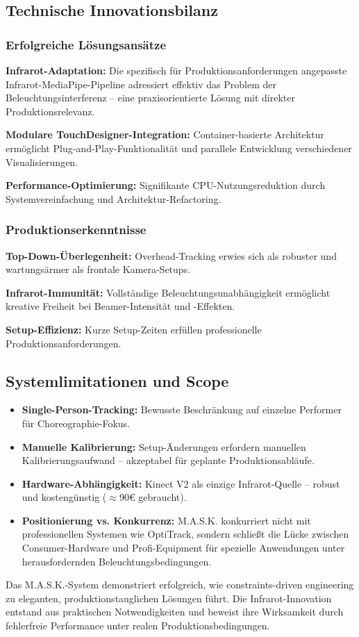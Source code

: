 \subsection{Technische Innovationsbilanz}

\subsubsection{Erfolgreiche Lösungsansätze}

\textbf{Infrarot-Adaptation:} Die spezifisch für Produktionsanforderungen angepasste Infrarot-MediaPipe-Pipeline adressiert effektiv das Problem der Beleuchtungsinterferenz – eine praxisorientierte Lösung mit direkter Produktionsrelevanz.

\textbf{Modulare TouchDesigner-Integration:} Container-basierte Architektur ermöglicht Plug-and-Play-Funktionalität und parallele Entwicklung verschiedener Visualisierungen.

\textbf{Performance-Optimierung:} Signifikante CPU-Nutzungsreduktion durch Systemvereinfachung und Architektur-Refactoring.

\subsubsection{Produktionserkenntnisse}

\textbf{Top-Down-Überlegenheit:} Overhead-Tracking erwies sich als robuster und wartungsärmer als frontale Kamera-Setups.

\textbf{Infrarot-Immunität:} Vollständige Beleuchtungsunabhängigkeit ermöglicht kreative Freiheit bei Beamer-Intensität und -Effekten.

\textbf{Setup-Effizienz:} Kurze Setup-Zeiten erfüllen professionelle Produktionsanforderungen.

\subsection{Systemlimitationen und Scope}

\begin{itemize}
    \item \textbf{Single-Person-Tracking:} Bewusste Beschränkung auf einzelne Performer für Choreographie-Fokus.
    \item \textbf{Manuelle Kalibrierung:} Setup-Änderungen erfordern manuellen Kalibrierungsaufwand – akzeptabel für geplante Produktionsabläufe.
    \item \textbf{Hardware-Abhängigkeit:} Kinect V2 als einzige Infrarot-Quelle – robust und kostengünstig ($\approx$90€ gebraucht).
    \item \textbf{Positionierung vs. Konkurrenz:} M.A.S.K. konkurriert nicht mit professionellen Systemen wie OptiTrack, sondern schließt die Lücke zwischen Consumer-Hardware und Profi-Equipment für spezielle Anwendungen unter herausfordernden Beleuchtungsbedingungen.
\end{itemize}

Das M.A.S.K.-System demonstriert erfolgreich, wie constraints-driven engineering zu eleganten, produktionstauglichen Lösungen führt. Die Infrarot-Innovation entstand aus praktischen Notwendigkeiten und beweist ihre Wirksamkeit durch fehlerfreie Performance unter realen Produktionsbedingungen.